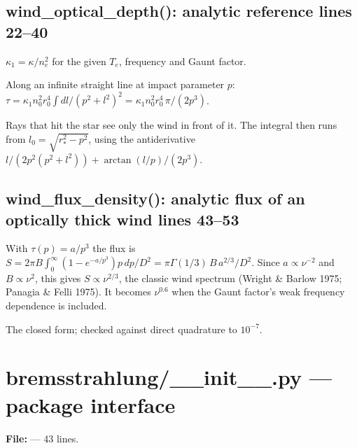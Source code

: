 \section*{\normalsize wind\_optical\_depth(): analytic reference \hfill{\small\mdseries\color{gray}lines 22--40}}

\begin{lines}
\item[L.28] $\kappa_1=\kappa/n_e^2$ for the given $T_e$, frequency and Gaunt factor.
\item[L.31] Along an infinite straight line at impact parameter $p$: $\tau=\kappa_1 n_0^2r_0^4\int dl/(p^2+l^2)^2=\kappa_1n_0^2r_0^4\,\pi/(2p^3)$.
\item[L.32–39] Rays that hit the star see only the wind in front of it. The integral then runs from $l_0=\sqrt{r_\ast^2-p^2}$, using the antiderivative $l/(2p^2(p^2+l^2))+\arctan(l/p)/(2p^3)$.
\end{lines}
\section*{\normalsize wind\_flux\_density(): analytic flux of an optically thick wind \hfill{\small\mdseries\color{gray}lines 43--53}}

With $\tau(p)=a/p^3$ the flux is $S=2\pi B\int_0^\infty(1-e^{-a/p^3})p\,dp/D^2=\pi\Gamma(1/3)\,B\,a^{2/3}/D^2$. Since $a\propto\nu^{-2}$ and $B\propto\nu^2$, this gives $S\propto\nu^{2/3}$, the classic wind spectrum (Wright \& Barlow 1975; Panagia \& Felli 1975). It becomes $\nu^{0.6}$ when the Gaunt factor's weak frequency dependence is included.

\begin{lines}
\item[L.53] The closed form; checked against direct quadrature to $10^{-7}$.
\end{lines}

\chapter{bremsstrahlung/\_\_init\_\_.py --- package interface}
\label{mod:bremsstrahlung:init.py}
\textbf{File:}  --- 43 lines.

